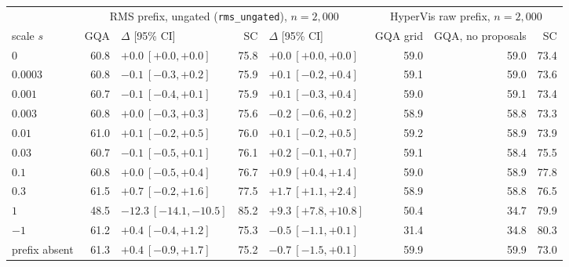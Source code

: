 \begin{tabular}{@{}l rl rl rrr@{}}
\toprule
 & \multicolumn{4}{c}{RMS prefix, ungated (\texttt{rms\_ungated}), $n{=}2{,}000$} & \multicolumn{3}{c}{HyperVis raw prefix, $n{=}2{,}000$} \\
\cmidrule(lr){2-5}\cmidrule(lr){6-8}
scale $s$ & GQA & $\Delta$ [95\% CI] & SC & $\Delta$ [95\% CI] & GQA grid & GQA, no proposals & SC \\
\midrule
$0$ & 60.8 & $+0.0\ [+0.0, +0.0]$ & 75.8 & $+0.0\ [+0.0, +0.0]$ & 59.0 & 59.0 & 73.4 \\
$0.0003$ & 60.8 & $-0.1\ [-0.3, +0.2]$ & 75.9 & $+0.1\ [-0.2, +0.4]$ & 59.1 & 59.0 & 73.6 \\
$0.001$ & 60.7 & $-0.1\ [-0.4, +0.1]$ & 75.9 & $+0.1\ [-0.3, +0.4]$ & 59.0 & 59.1 & 73.4 \\
$0.003$ & 60.8 & $+0.0\ [-0.3, +0.3]$ & 75.6 & $-0.2\ [-0.6, +0.2]$ & 58.9 & 58.8 & 73.3 \\
$0.01$ & 61.0 & $+0.1\ [-0.2, +0.5]$ & 76.0 & $+0.1\ [-0.2, +0.5]$ & 59.2 & 58.9 & 73.9 \\
$0.03$ & 60.7 & $-0.1\ [-0.5, +0.1]$ & 76.1 & $+0.2\ [-0.1, +0.7]$ & 59.1 & 58.4 & 75.5 \\
$0.1$ & 60.8 & $+0.0\ [-0.5, +0.4]$ & 76.7 & $+0.9\ [+0.4, +1.4]$ & 59.0 & 58.9 & 77.8 \\
$0.3$ & 61.5 & $+0.7\ [-0.2, +1.6]$ & 77.5 & $+1.7\ [+1.1, +2.4]$ & 58.9 & 58.8 & 76.5 \\
$1$ & 48.5 & $-12.3\ [-14.1, -10.5]$ & 85.2 & $+9.3\ [+7.8, +10.8]$ & 50.4 & 34.7 & 79.9 \\
$-1$ & 61.2 & $+0.4\ [-0.4, +1.2]$ & 75.3 & $-0.5\ [-1.1, +0.1]$ & 31.4 & 34.8 & 80.3 \\
\midrule
prefix absent & 61.3 & $+0.4\ [-0.9, +1.7]$ & 75.2 & $-0.7\ [-1.5, +0.1]$ & 59.9 & 59.9 & 73.0 \\
\bottomrule
\end{tabular}
